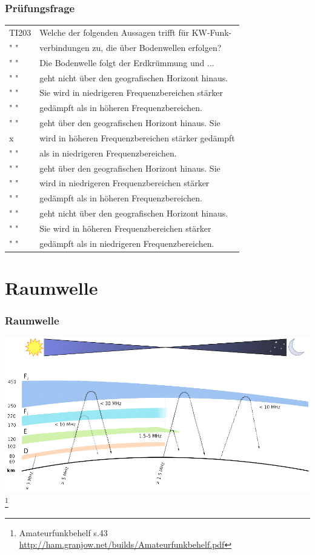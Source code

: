 \begin{frame}
    \frametitle{Prüfungsfrage}

    \begin{center}
    \begin{tabular}{l||l}\hline
        TI203 & Welche der folgenden Aussagen trifft für KW-Funk- \\
         " "  & verbindungen zu, die über Bodenwellen erfolgen? \\ 
         " "  & Die Bodenwelle folgt der Erdkrümmung und ...\\\hline\hline
         " " 	  & geht nicht über den geografischen Horizont hinaus. \\
         " "  & Sie wird in niedrigeren Frequenzbereichen stärker \\ 
         " "  & gedämpft als in höheren Frequenzbereichen.\\\hline
         " " 	  & geht über den geografischen Horizont hinaus. Sie \\
         x  & wird in höheren Frequenzbereichen stärker gedämpft \\ 
         " "  & als in niedrigeren Frequenzbereichen.\\\hline
         " "	  & geht über den geografischen Horizont hinaus. Sie \\
         " "  & wird in niedrigeren Frequenzbereichen stärker \\ 
         " "  & gedämpft als in höheren Frequenzbereichen.\\\hline
         " " 	  & geht nicht über den geografischen Horizont hinaus. \\
         " "  & Sie wird in höheren Frequenzbereichen stärker \\ 
         " "  & gedämpft als in niedrigeren Frequenzbereichen.\\\hline
    \end{tabular}
 	\end{center}
\end{frame}

\section*{Raumwelle}
    
\begin{frame}
    \frametitle{Raumwelle}
	\begin{center}
        \includegraphics[width=.9\textwidth]{e09/schichten_behelf_43.png}
        \footnote{\tiny Amateurfunkbehelf s.43 \url{http://ham.granjow.net/builds/Amateurfunkbehelf.pdf}}
    \end{center}
\end{frame}

